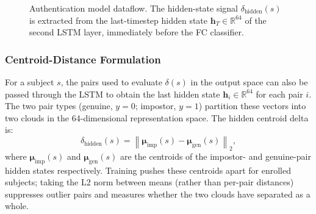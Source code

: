 \begin{figure}[htbp]
\centering
{}%
\caption{Authentication model dataflow. The hidden-state signal $\delta_\text{hidden}(s)$
         is extracted from the last-timestep hidden state $\mathbf{h}_T \in \mathbb{R}^{64}$
         of the second LSTM layer, immediately before the FC classifier.}
\label{fig:lstm_arch}
\end{figure}

\FloatBarrier
\subsubsection{Centroid-Distance Formulation}
\label{ssec:mia_hidden_formula}

For a subject $s$, the pairs used to evaluate $\delta(s)$ in the output space can also be passed through the LSTM to obtain the last hidden state $\mathbf{h}_i \in \mathbb{R}^{64}$ for each pair $i$. The two pair types (genuine, $y=0$; impostor, $y=1$) partition these vectors into two clouds in the 64-dimensional representation space. The hidden centroid delta is:
\begin{equation}
  \delta_\text{hidden}(s)
  = \left\lVert
      \boldsymbol{\mu}_\text{imp}(s) - \boldsymbol{\mu}_\text{gen}(s)
    \right\rVert_2,
\end{equation}
where $\boldsymbol{\mu}_\text{imp}(s)$ and $\boldsymbol{\mu}_\text{gen}(s)$ are the centroids of the impostor- and genuine-pair hidden states respectively. Training pushes these centroids apart for enrolled subjects; taking the L2 norm between means (rather than per-pair distances) suppresses outlier pairs and measures whether the two clouds have separated as a whole.

